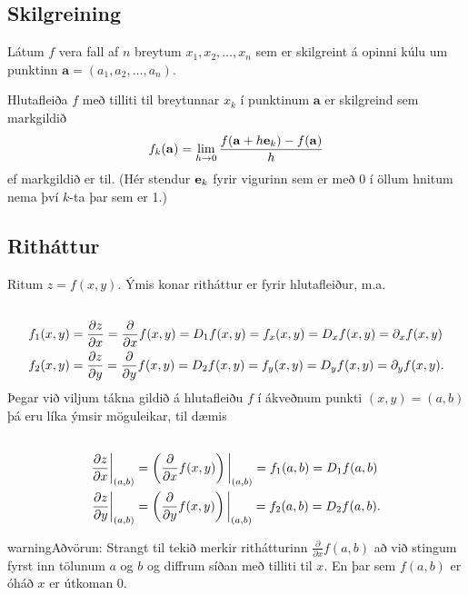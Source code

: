 \documentclass[a4paper,10pt,icelandic]{sphinxmanual}
\begin{document}
\subsection{Skilgreining}
\label{Kafli2:id12}
Látum \(f\) vera fall af \(n\) breytum
\(x_1,x_2,\ldots,x_n\) sem er skilgreint á opinni kúlu um punktinn
\(\mathbf{a}=(a_1, a_2, \ldots, a_n).\)

Hlutafleiða \(f\) með tilliti til breytunnar \(x_k\) í punktinum
\(\mathbf{a}\) er skilgreind sem markgildið
\begin{gather}
\begin{split}\displaystyle f_k(\mathbf{a})=\lim_{h\rightarrow 0}\frac{f(\mathbf{a}+h\mbox{${\bf e}$}_k)-f(\mathbf{a})}{h}\end{split}\notag
\end{gather}
ef markgildið er til. (Hér stendur \(\mbox{${\bf e}$}_k\) fyrir
vigurinn sem er með 0 í öllum hnitum nema því \(k\)-ta þar sem er
1.)


\subsection{Ritháttur}
\label{Kafli2:id13}
Ritum \(z=f(x,y)\).  Ýmis konar ritháttur er fyrir hlutafleiður, m.a.
\begin{gather}
\begin{split}\displaystyle\end{split}\notag\\\begin{split}\begin{aligned}
f_1(x,y)&=\frac{\partial z}{\partial x}=  \frac{\partial }{\partial x}f(x,y)
=D_1f(x,y)=f_x(x,y)=D_xf(x,y)=\partial_xf(x,y) \\
f_2(x,y)&=\frac{\partial z}{\partial y}=  \frac{\partial }{\partial y}f(x,y)
=D_2f(x,y)=f_y(x,y)=D_yf(x,y)=\partial_yf(x,y). \end{aligned}\end{split}\notag
\end{gather}
Þegar við viljum tákna gildið á hlutafleiðu \(f\) í ákveðnum punkti
\((x,y)=(a,b)\) þá eru líka ýmsir möguleikar, til dæmis
\begin{gather}
\begin{split}\displaystyle\end{split}\notag\\\begin{split}\begin{aligned}
\frac{\partial z}{\partial x}\bigg|_{(a,b)}&=
\left(\frac{\partial }{\partial x}f(x,y)\right)\bigg|_{(a,b)}
=f_1(a,b)=D_1f(a,b) \\
\frac{\partial z}{\partial y}\bigg|_{(a,b)}&=
\left(\frac{\partial }{\partial y}f(x,y)\right)\bigg|_{(a,b)}
=f_2(a,b)=D_2f(a,b). \end {aligned}\end{split}\notag
\end{gather}
\begin{notice}{warning}{Aðvörun:}
Strangt til tekið merkir rithátturinn \(\frac{\partial}{\partial x} f(a,b)\) að við stingum fyrst
inn tölunum \(a\) og \(b\) og diffrum síðan með tilliti til \(x\). En þar sem \(f(a,b)\) er
óháð \(x\) er útkoman 0.
\end{notice}
\end{document}
